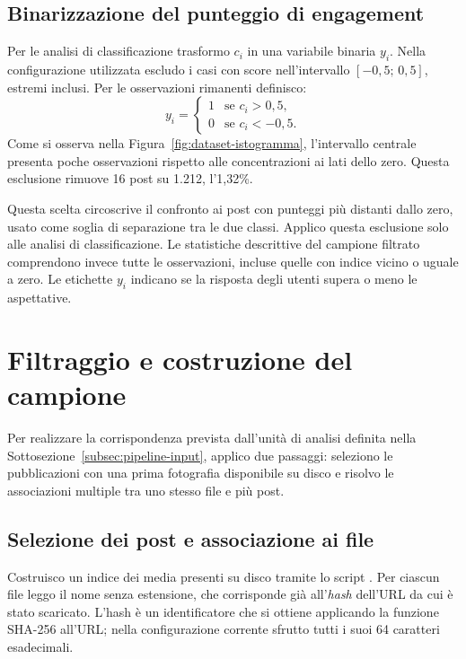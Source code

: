 \subsection{Binarizzazione del punteggio di engagement}
\label{subsec:dataset-binarizzazione}

Per le analisi di classificazione trasformo $c_i$ in una variabile binaria $y_i$. Nella configurazione utilizzata escludo i casi con score nell'intervallo $[-0{,}5;\,0{,}5]$, estremi inclusi. Per le osservazioni rimanenti definisco:
\begin{equation}
    y_i =
    \begin{cases}
        1 & \text{se } c_i > 0{,}5, \\
        0 & \text{se } c_i < -0{,}5.
    \end{cases}
    \label{eq:dataset-target}
\end{equation}
Come si osserva nella Figura~\ref{fig:dataset-istogramma}, l'intervallo centrale presenta poche osservazioni rispetto alle concentrazioni ai lati dello zero. Questa esclusione rimuove 16 post su 1.212, l'1,32\%.

Questa scelta circoscrive il confronto ai post con punteggi più distanti dallo zero, usato come soglia di separazione tra le due classi. Applico questa esclusione solo alle analisi di classificazione. Le statistiche descrittive del campione filtrato comprendono invece tutte le osservazioni, incluse quelle con indice vicino o uguale a zero. Le etichette $y_i$ indicano se la risposta degli utenti supera o meno le aspettative.

\newpage
\section{Filtraggio e costruzione del campione}
\label{sec:dataset-selezione}

Per realizzare la corrispondenza prevista dall'unità di analisi definita nella Sottosezione~\ref{subsec:pipeline-input}, applico due passaggi: seleziono le pubblicazioni con una prima fotografia disponibile su disco e risolvo le associazioni multiple tra uno stesso file e più post.

\subsection{Selezione dei post e associazione ai file}
\label{subsec:dataset-filtraggio}

Costruisco un indice dei media presenti su disco tramite lo script . Per ciascun file leggo il nome senza estensione, che corrisponde già all'\emph{hash} dell'URL da cui è stato scaricato. L'hash è un identificatore che si ottiene applicando la funzione SHA-256 all'URL; nella configurazione corrente sfrutto tutti i suoi 64 caratteri esadecimali.

